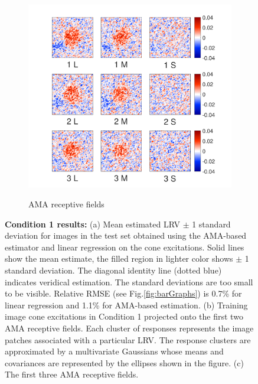 \documentclass{jov}
\begin{document}
\begin{figure}
\begin{subfigure}[b]{0.31 \textwidth}
        \label{fig:case1RFResponse}
    \end{subfigure}
    \begin{subfigure}[b]{0.32 \textwidth}
	\caption{AMA receptive fields}
	\includegraphics[width=1.0\textwidth, trim={0.2cm -0.cm 0 0.3cm}]{../FiguresDraft5/Figure10/Figure10_c.pdf}
	\label{fig:case1RFs}
    \end{subfigure}   
    \caption{{\bf Condition 1 results:} (a) Mean estimated LRV $\pm$ 1 standard deviation for images in the test set obtained using the AMA-based estimator and linear regression on the cone excitations. Solid lines show the mean estimate, the filled region in lighter color shows $\pm$ 1 standard deviation. The diagonal identity line (dotted blue) indicates veridical estimation. The standard deviations are too small to be visible. Relative RMSE (see Fig.\ref{fig:barGraphs}) is 0.7\% for linear regression and 1.1\%  for AMA-based estimation. (b) Training image cone excitations in Condition 1 projected onto the first two AMA receptive fields. Each cluster of responses represents the image patches associated with a particular LRV. The response clusters are approximated by a multivariate Gaussians whose means and covariances are represented by the ellipses shown in the figure. (c) The first three AMA receptive fields.}
\label{fig:Condition1}
\end{figure}
\end{document}
